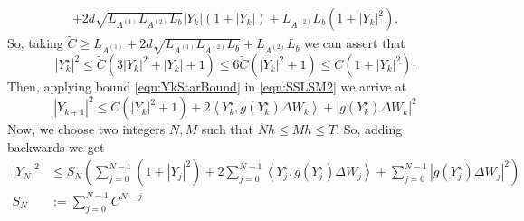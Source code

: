 \documentclass[sort&compress, preprint]{elsarticle}
\theoremstyle{definition}
\theoremstyle{plain}%
\theoremstyle{remark}
\newcommand{\innerprod}[2]{\left\langle#1, #2\right\rangle}
\begin{document}
\begin{pf}
\begin{align*}
			+ 2 d \sqrt{L_{A^{(1)}} L_{A^{(2)}} L_b }|Y_k|(1+|Y_k|)
			+L_{A^{(2)}} L_b (1+|Y_k|^2).
	\end{align*}
	So, taking $\widetilde{C}\geq L_{A^{(1)}}+ 2 d \sqrt{L_{A^{(1)}} L_{A^{(2)}} L_b} + L_{A^{(2)}} L_b$ we can assert 
	that
	\begin{equation}\label{eqn:YkStarBound}
		|Y^{\star}_k|^2
			\leq 
				\widetilde{C}(3|Y_k|^2+|Y_k| + 1) 
			\leq 
				6\widetilde{C}\left(
					|Y_k|^2+1
				\right)
			\leq C(1+|Y_k|^2).
	\end{equation} 
	Then, applying bound \eqref{eqn:YkStarBound} in \cref{eqn:SSLSM2} we arrive at
	\begin{equation*}
		|Y_{k+1}|^2
		\leq
			C \left(
				|Y_k|^2 + 1
			\right)
			+ 2\innerprod{Y^{\star}_k}{g(Y^{\star}_k) \Delta W_k}
			+ \left|g(Y^{\star}_k) \Delta W_k \right|^2
	\end{equation*}
	Now, we choose two integers $N,M$ such that $Nh\leq Mh \leq T$. So, adding backwards we get
	\begin{align*}
		|Y_N|^2
			&\leq
			S_N\left(
				\sum_{j=0}^{N-1}
					(1+|Y_j|^2)
				+
				2\sum_{j=0}^{N-1}
					\innerprod{Y_j^{\star}}{g(Y_j^{\star}) \Delta W_j}
				+
				\sum_{j=0}^{N-1}
					\left|
						g(Y_j^{\star}) \Delta W_j
					\right|^2
			\right)\\
			S_N
				&:=
				\sum_{j=0}^{N-1}
					C^{N-j} 			
	\end{align*}


\end{pf}
\end{document}

